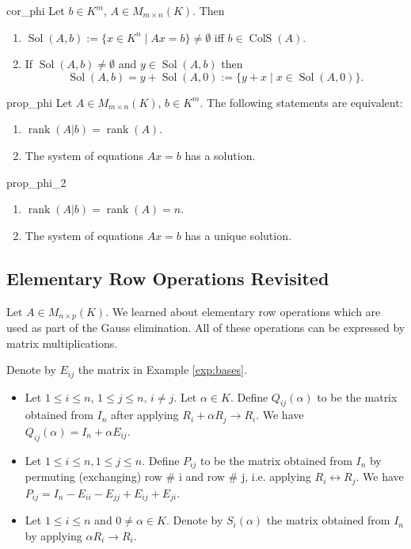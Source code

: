 \begin{corollary}{}{cor_phi}
	Let $b \in K^m$, $A \in M_{m \times n}(K)$. Then
	\begin{enumerate}
		\item $\operatorname{Sol}(A, b) := \{x \in K^n \;|\; Ax = b\} \neq \emptyset$ iff $b \in \operatorname{ColS}(A)$.
		\item If $\operatorname{Sol}(A, b) \neq \emptyset$ and $y \in \operatorname{Sol}(A, b)$ then
		\[
			\operatorname{Sol}(A,b) = y + \operatorname{Sol}(A,0) := \{y + x \;|\; x \in \operatorname{Sol}(A, 0)\}.
		\] 
	\end{enumerate}
\end{corollary}

\begin{proposition}{}{prop_phi}
	Let $A \in M_{m \times n}(K)$, $b \in K^m$. The following statements are equivalent:
	\begin{enumerate}
		\item $\operatorname{rank}(A | b) = \operatorname{rank}(A)$.
		\item The system of equations $Ax = b$ has a solution.
	\end{enumerate}
\end{proposition}

\begin{proposition}{}{prop_phi_2}
	\begin{enumerate}
		\item $\operatorname{rank}(A | b) = \operatorname{rank}(A) = n$.
		\item The system of equations $Ax = b$ has a unique solution.
	\end{enumerate}
\end{proposition}

\subsection{Elementary Row Operations Revisited}
Let $A \in M_{n \times p}(K)$. We learned about elementary row operations which are used as part of the Gauss elimination. All of these operations can be expressed by matrix multiplications.

Denote by $E_{ij}$ the matrix in Example \ref{exp:bases}.

\begin{itemize}
	\item[\textbf{Type I:}] Let $1 \leq i \leq n$, $1 \leq j \leq n$, $i \neq j$. Let $\alpha \in K$. Define $Q_{ij}(\alpha)$ to be the matrix obtained from $I_n$ after applying $R_i + \alpha R_j \longrightarrow R_i$. We have $Q_{ij}(\alpha) = I_n + \alpha E_{ij}$.
	
	\item[\textbf{Type II:}] Let $1 \leq i \leq n, 1 \leq j \leq n$. Define $P_{ij}$ to be the matrix obtained from $I_n$ by permuting (exchanging) row \# i and row \# j, i.e. applying $R_i \longleftrightarrow R_j$. We have $P_{ij} = I_n - E_{ii} - E_{jj} + E_{ij} + E_{ji}$.
	\item[\textbf{Type III:}] Let $1 \leq i \leq n$ and $0 \neq \alpha \in K$. Denote by $S_i(\alpha)$ the matrix obtained from $I_n$ by applying $\alpha R_i \longrightarrow R_i$.
\end{itemize}

